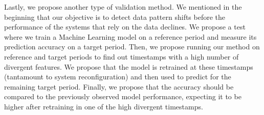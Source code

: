 \documentclass[sigconf]{acmart}
\begin{document}
Lastly, we propose another type of validation method. We mentioned in the beginning that our objective is to detect data pattern shifts before the performance of the systems that rely on the data declines. We propose a test where we train a Machine Learning model on a reference period and measure its prediction accuracy on a target period. Then, we propose running our method on reference and target periods to find out timestamps with a high number of divergent features. We propose that the model is retrained at these timestamps (tantamount to system reconfiguration) and then used to predict for the remaining target period. Finally, we propose that the accuracy should be compared to the previously observed model performance, expecting it to be higher after retraining in one of the high divergent timestamps.





\end{document}
